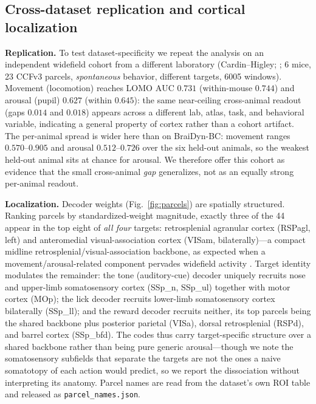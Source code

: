 \documentclass{article}
\newcommand{\auc}{\mathrm{AUC}}
\begin{document}
\subsection{Cross-dataset replication and cortical localization}
\label{sec:repl}
\textbf{Replication.} To test dataset-specificity we repeat the analysis on an independent
widefield cohort from a different laboratory (Cardin--Higley; \citealp{benisty2024}; 6 mice, 23
CCFv3 parcels, \emph{spontaneous} behavior, different targets, 6005 windows). Movement
(locomotion) reaches LOMO $\auc$ $0.731$ (within-mouse $0.744$) and arousal (pupil) $0.627$
(within $0.645$): the same near-ceiling cross-animal readout (gaps $0.014$ and $0.018$) appears
across a different lab, atlas, task, and behavioral variable, indicating a general property of
cortex rather than a cohort artifact. The per-animal spread is wider here than on BraiDyn-BC:
movement ranges $0.570$--$0.905$ and arousal $0.512$--$0.726$ over the six held-out animals, so the
weakest held-out animal sits at chance for arousal. We therefore offer this cohort as evidence
that the small cross-animal \emph{gap} generalizes, not as an equally strong per-animal readout.

\textbf{Localization.} Decoder weights (Fig.~\ref{fig:parcels}) are spatially structured. Ranking
parcels by standardized-weight magnitude, exactly three of the 44 appear in the top eight of
\emph{all four} targets: retrosplenial agranular cortex (RSPagl, left) and anteromedial
visual-association cortex (VISam, bilaterally)---a compact midline retrosplenial/visual-association
backbone, as expected when a movement/arousal-related component pervades widefield activity
\citep{musall2019}. Target identity modulates the remainder: the tone (auditory-cue) decoder
uniquely recruits nose and upper-limb somatosensory cortex (SSp\_n, SSp\_ul) together with motor
cortex (MOp); the lick decoder recruits lower-limb somatosensory cortex bilaterally (SSp\_ll); and
the reward decoder recruits neither, its top parcels being the shared backbone plus posterior
parietal (VISa), dorsal retrosplenial (RSPd), and barrel cortex (SSp\_bfd). The codes thus carry
target-specific structure over a shared backbone rather than being pure generic arousal---though
we note the somatosensory subfields that separate the targets are not the ones a naive somatotopy
of each action would predict, so we report the dissociation without interpreting its anatomy.
Parcel names are read from the dataset's own ROI table and released as
\texttt{parcel\_names.json}.
\end{document}
